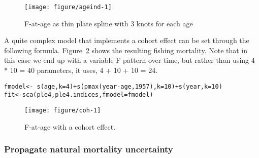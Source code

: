 \documentclass[a4paper,english,10pt]{article}\usepackage[]{graphicx}\usepackage[]{color}
\makeatletter
\def\maxwidth{ %
  \ifdim\Gin@nat@width>\linewidth
    \linewidth
  \else
    \Gin@nat@width
  \fi
}
\newcommand{\hlnum}[1]{\textcolor[rgb]{0.2,0.2,0.2}{#1}}%
\newcommand{\hlopt}[1]{\textcolor[rgb]{0.2,0.2,0.2}{#1}}%
\newcommand{\hlstd}[1]{\textcolor[rgb]{0,0,0}{#1}}%
\newcommand{\hlkwb}[1]{\textcolor[rgb]{0.361,0.506,0.596}{#1}}%
\newcommand{\hlkwc}[1]{\textcolor[rgb]{0.361,0.506,0.596}{#1}}%
\newcommand{\hlkwd}[1]{\textcolor[rgb]{0.361,0.506,0.596}{#1}}%
\newenvironment{kframe}{%
 \def\at@end@of@kframe{}%
 \ifinner\ifhmode%
  \def\at@end@of@kframe{\end{minipage}}%
  \begin{minipage}{\columnwidth}%
 \fi\fi%
 \def\FrameCommand##1{\hskip\@totalleftmargin \hskip-\fboxsep
 \colorbox{shadecolor}{##1}\hskip-\fboxsep
     \hskip-\linewidth \hskip-\@totalleftmargin \hskip\columnwidth}%
 \MakeFramed {\advance\hsize-\width
   \@totalleftmargin\z@ \linewidth\hsize
   \@setminipage}}%
 {\par\unskip\endMakeFramed%
 \at@end@of@kframe}
\newenvironment{knitrout}{}{} %
\makeatother
\begin{document}
\begin{knitrout}
\color{fgcolor}\begin{figure}[H]

{\centering \texttt{[image: figure/ageind-1]} 

}

\caption[F-at-age as thin plate spline with 3 knots for each age]{F-at-age as thin plate spline with 3 knots for each age\label{fig:ageind}}
\end{figure}


\end{knitrout}

A quite complex model that implements a cohort effect can be set through the following formula. Figure~\ref{fig:coh} shows the resulting fishing mortality. Note that in this case we end up with a variable F pattern over time, but rather than using 4 * 10 = 40 parameters, it uses, 4 + 10 + 10 = 24.

\begin{knitrout}
\color{fgcolor}\begin{kframe}
\begin{alltt}
\hlstd{fmodel} \hlkwb{<-} \hlopt{~} \hlkwd{s}\hlstd{(age,} \hlkwc{k} \hlstd{=} \hlnum{4}\hlstd{)} \hlopt{+} \hlkwd{s}\hlstd{(}\hlkwd{pmax}\hlstd{(year} \hlopt{-} \hlstd{age,} \hlnum{1957}\hlstd{),} \hlkwc{k} \hlstd{=} \hlnum{10}\hlstd{)} \hlopt{+} \hlkwd{s}\hlstd{(year,} \hlkwc{k} \hlstd{=} \hlnum{10}\hlstd{)}
\hlstd{fit} \hlkwb{<-} \hlkwd{sca}\hlstd{(ple4, ple4.indices,} \hlkwc{fmodel}\hlstd{=fmodel)}
\end{alltt}
\end{kframe}
\end{knitrout}

\begin{knitrout}
\color{fgcolor}\begin{figure}[H]

{\centering \texttt{[image: figure/coh-1]} 

}

\caption[F-at-age with a cohort effect]{F-at-age with a cohort effect.\label{fig:coh}}
\end{figure}


\end{knitrout}

\subsubsection{Propagate natural mortality uncertainty}
\end{document}
